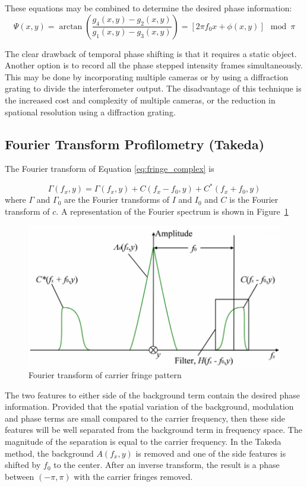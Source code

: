 \documentclass[11pt]{article} %
\begin{document}
These equations may be combined to determine the desired phase information:
\begin{equation}
	\Psi(x,y) = \arctan \left ( \frac{g_4(x,y) - g_2(x,y)}{g_1(x,y)-g_3(x,y)}\right ) = \left[ 2 \pi f_0 x + \phi(x,y) \right] \mod \pi
	\label{ }
\end{equation}


The clear drawback of temporal phase shifting is that it requires a static object. Another option is to record all the phase stepped intensity frames simultaneously. This may be done by incorporating multiple cameras or by using a diffraction grating to divide the interferometer output. The disadvantage of this technique is the increased  cost and complexity of multiple cameras, or the reduction in spational resolution using a diffraction grating. 



\subsection{Fourier Transform Profilometry (Takeda) }
The Fourier transform of Equation \ref{eq:fringe_complex} is

\begin{equation}
	\Gamma(f_x, y) = \Gamma(f_x, y) + C(f_x - f_0, y) + C^* (f_x +f_0, y)
\end{equation}
where $\Gamma$ and $\Gamma_0$ are the Fourier transforms of $I$ and $I_0$ and $C$ is the Fourier transform of $c$. A representation of the Fourier spectrum is shown in Figure~\ref{fig:fourierSpectrum}

\begin{figure}
	\centering
	\includegraphics[width=0.75\linewidth]{fig/carrierFourier}
	\caption{Fourier transform of carrier fringe pattern}
	\label{fig:fourierSpectrum}
\end{figure}

The two features to either side of the background term contain the desired phase information. Provided that the spatial variation of the background, modulation and phase terms are small compared to the carrier frequency, then these side features will be well separated from the background term in frequency space. The magnitude of the separation is equal to the carrier frequency. In the Takeda method, the background $A(f_x,y)$ is removed and one of the side features is shifted by $f_0$ to the center. After an inverse transform, the result is a phase between $(-\pi, \pi)$ with the carrier fringes removed.
\end{document}
